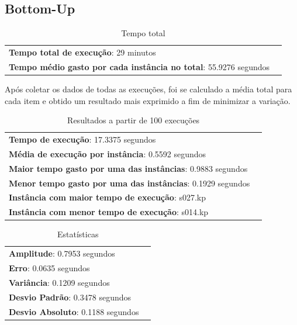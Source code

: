 \documentclass[a4paper, 12pt]{article}
\begin{document}
\hrulefill

\subsection{Bottom-Up}
\begin{table}[!htb]
    \begin{tabular}{ll}
        {\bf Tempo total de execução}: 29 minutos\\
        {\bf Tempo médio gasto por cada instância no total}: 55.9276 segundos
    \end{tabular}
    \caption{Tempo total}
    \label{tab:total_bottomup}
\end{table}
Após coletar os dados de todas as execuções, foi se calculado a média total para cada item e obtido um resultado 
mais exprimido a fim de minimizar a variação.
\begin{table}[!htb]
    \begin{tabular}{ll}
        {\bf Tempo de execução}: 17.3375 segundos\\
        {\bf Média de execução por instância}: 0.5592 segundos\\
        {\bf Maior tempo gasto por uma das instâncias}: 0.9883 segundos\\
        {\bf Menor tempo gasto por uma das instâncias}: 0.1929 segundos \\
        {\bf Instância com maior tempo de execução}: s027.kp\\
        {\bf Instância com menor tempo de execução}: s014.kp
    \end{tabular}
    \caption{Resultados a partir de 100 execuções}
    \label{tab:result_tot_bottomup}
\end{table}


\begin{table}[!htb]
    \begin{tabular}{ll}
        {\bf Amplitude}: 0.7953 segundos\\
        {\bf Erro}: 0.0635 segundos\\
        {\bf Variância}: 0.1209 segundos\\
        {\bf Desvio Padrão}: 0.3478 segundos\\
        {\bf Desvio Absoluto}: 0.1188 segundos
    \end{tabular}
    \caption{Estatísticas}
    \label{tab:estatistica_tot_bottomup}
\end{table}
\end{document}
